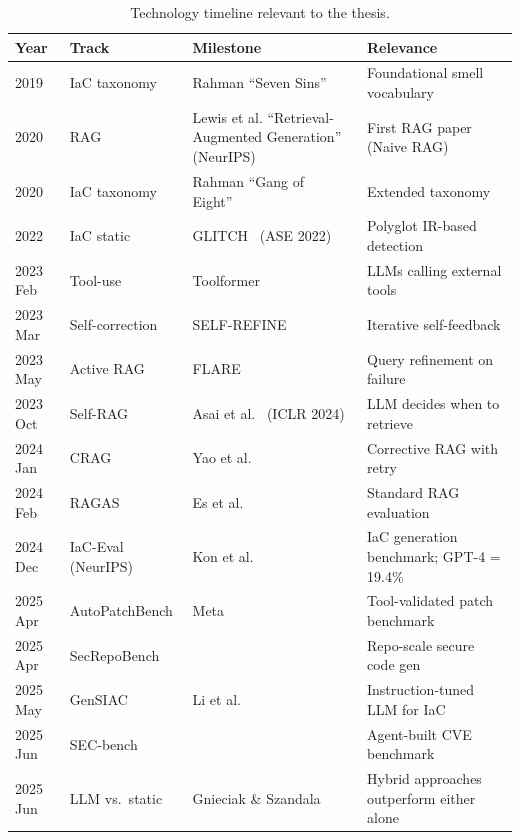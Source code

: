 \documentclass[11pt, a4paper]{report}
\begin{document}
\begin{table}[H]
  \centering
  \caption{Technology timeline relevant to the thesis.}
  \label{tab:timeline_skel}
  \small
  \begin{tabularx}{\linewidth}{lll X}
    \toprule
    \textbf{Year} & \textbf{Track} & \textbf{Milestone} & \textbf{Relevance} \\
    \midrule
    2019 & IaC taxonomy & Rahman ``Seven Sins''~\citep{rahman2019seven}
    & Foundational smell vocabulary \\
    2020 & RAG & Lewis et al. ``Retrieval-Augmented Generation'' (NeurIPS)
    & First RAG paper (Naive RAG) \\
    2020 & IaC taxonomy & Rahman ``Gang of Eight''~\citep{rahman2020gang}
    & Extended taxonomy \\
    2022 & IaC static & GLITCH~\citep{saavedra2022glitch} (ASE 2022)
    & Polyglot IR-based detection \\
    2023 Feb & Tool-use & Toolformer~\citep{schick2023toolformer} &
    LLMs calling external tools \\
    2023 Mar & Self-correction &
    SELF-REFINE~\citep{madaan2023selfrefine} &
    Iterative self-feedback \\
    2023 May & Active RAG & FLARE~\citep{jiang2023flare} &
    Query refinement on failure \\
    2023 Oct & Self-RAG & Asai et al.~\citep{asai2023selfrag} (ICLR 2024)
    & LLM decides when to retrieve \\
    2024 Jan & CRAG & Yao et al.~\citep{yao2024crag} &
    Corrective RAG with retry \\
    2024 Feb & RAGAS & Es et al.~\citep{es2024ragas} &
    Standard RAG evaluation \\
    2024 Dec & IaC-Eval (NeurIPS) & Kon et al.~\citep{kon2024iaceval}
    & IaC generation benchmark; GPT-4 = 19.4\% \\
    2025 Apr & AutoPatchBench & Meta~\citep{autopatchbench2025}
    & Tool-validated patch benchmark \\
    2025 Apr & SecRepoBench & \citep{secrepobench2025}
    & Repo-scale secure code gen \\
    2025 May & GenSIAC & Li et al.~\citep{li2025gensiac} &
    Instruction-tuned LLM for IaC \\
    2025 Jun & SEC-bench & \citep{secbench2025} &
    Agent-built CVE benchmark \\
    2025 Jun & LLM vs.~static & Gnieciak \& Szandala~\citep{gnieciak2025llmvsstatic}
    & Hybrid approaches outperform either alone \\

\end{tabularx}
\end{table}
\end{document}
